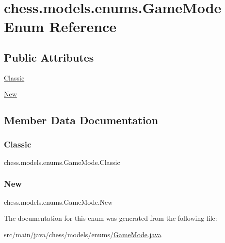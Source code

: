 \hypertarget{enumchess_1_1models_1_1enums_1_1_game_mode}{}\section{chess.\+models.\+enums.\+Game\+Mode Enum Reference}
\label{enumchess_1_1models_1_1enums_1_1_game_mode}
\subsection*{Public Attributes}
\begin{DoxyCompactItemize}
\item 
\mbox{\hyperlink{enumchess_1_1models_1_1enums_1_1_game_mode_ac77c07197becd077c3c5bb8906f60b1e}{Classic}}
\item 
\mbox{\hyperlink{enumchess_1_1models_1_1enums_1_1_game_mode_a4f5517a647fcb4190a521a8b5d7cf0b0}{New}}
\end{DoxyCompactItemize}


\subsection{Member Data Documentation}
\mbox{\label{enumchess_1_1models_1_1enums_1_1_game_mode_ac77c07197becd077c3c5bb8906f60b1e}} 
\subsubsection{\texorpdfstring{Classic}{Classic}}
{\footnotesize\ttfamily chess.\+models.\+enums.\+Game\+Mode.\+Classic}

\mbox{\label{enumchess_1_1models_1_1enums_1_1_game_mode_a4f5517a647fcb4190a521a8b5d7cf0b0}} 
\subsubsection{\texorpdfstring{New}{New}}
{\footnotesize\ttfamily chess.\+models.\+enums.\+Game\+Mode.\+New}



The documentation for this enum was generated from the following file\+:\begin{DoxyCompactItemize}
\item 
src/main/java/chess/models/enums/\mbox{\hyperlink{_game_mode_8java}{Game\+Mode.\+java}}\end{DoxyCompactItemize}
